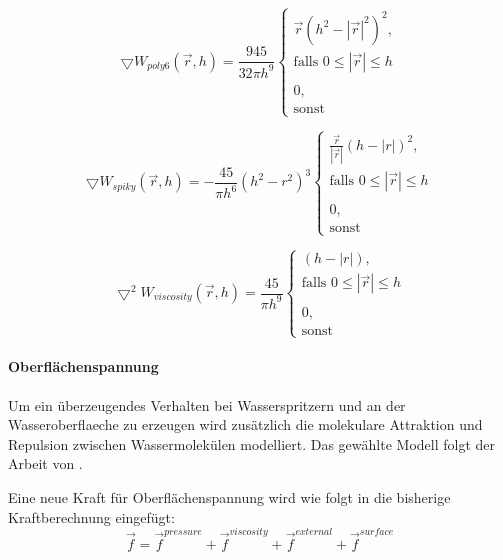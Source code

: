 \documentclass[a4paper]{paper}
\begin{document}
\begin{equation}
\label{gradient_poly6}
\bigtriangledown W_{poly6}(\vec{r},h) = \frac{945}{32 \pi h^9} 
\begin{cases}
\vec{r}(h^2-|\vec{r}|^2)^2, \\ \text{falls } 0 \leq |\vec{r}| \leq h  \\
\\
0, \\ \text{sonst}
\end{cases}
\end{equation}

\begin{equation}
\label{spiky}
\bigtriangledown W_{spiky}(\vec{r},h) = -\frac{45}{\pi h^6} (h^2-r^2)^3
\begin{cases}
\frac{\vec{r}}{|\vec{r}|}(h-|r|)^2, \\ \text{falls } 0 \leq |\vec{r}| \leq h\\

\\ 0, \\ \text{sonst}
\end{cases}
\end{equation}

\begin{equation}
\label{viscosity}
\bigtriangledown^2 W_{viscosity}(\vec{r},h) = \frac{45}{\pi h^9} 
\begin{cases}
(h-|r|),

\\ \text{falls } 0 \leq |\vec{r}| \leq h \\
\\
0, 
\\ \text{sonst}
\end{cases}
\end{equation}


\paragraph{Oberflächenspannung}
Um ein überzeugendes Verhalten bei Wasserspritzern und an der Wasseroberflaeche zu erzeugen wird zusätzlich die molekulare Attraktion und Repulsion zwischen Wassermolekülen modelliert. Das gewählte Modell folgt der Arbeit von \citep{SurfaceTension}.

Eine neue Kraft für Oberflächenspannung wird wie folgt in die bisherige Kraftberechnung eingefügt:
\begin{equation}
\label{force_with_surface}
\vec{f} = \vec{f}^{pressure} + \vec{f}^{viscosity} + \vec{f}^{external} + \vec{f}^{surface}
\end{equation}
\end{document}
